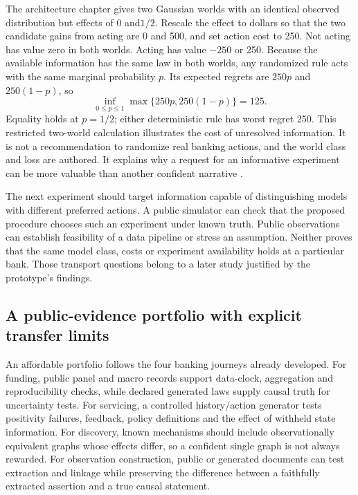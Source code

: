 The architecture chapter gives two Gaussian worlds with an identical observed
distribution but effects of 0 and$1/2$. Rescale the effect to dollars so that
the two candidate gains from acting are 0 and 500, and set action cost to 250.
Not acting has value zero in both worlds. Acting has value $-250$ or 250.
Because the available information has the same law in both worlds, any
randomized rule acts with the same marginal probability $p$. Its expected
regrets are $250p$ and $250(1-p)$, so
\begin{equation}
 \inf_{0\leq p\leq1}\max\{250p,250(1-p)\}=125.
 \label{exec13:frontier-minimax}
\end{equation}
Equality holds at $p=1/2$; either deterministic rule has worst regret 250.
This restricted two-world calculation illustrates the cost of unresolved
information. It is not a recommendation to randomize real banking actions,
and the world class and loss are authored. It explains why a request for an
informative experiment can be more valuable than another confident narrative
\cite{exec13_architecture_exact,exec13_frontier_exact}.

The next experiment should target information capable of distinguishing models
with different preferred actions. A public simulator can check that the
proposed procedure chooses such an experiment under known truth. Public
observations can establish feasibility of a data pipeline or stress an
assumption. Neither proves that the same model class, costs or experiment
availability holds at a particular bank. Those transport questions belong to
a later study justified by the prototype's findings.

\subsection{A public-evidence portfolio with explicit transfer limits}

An affordable portfolio follows the four banking journeys already developed.
For funding, public panel and macro records support data-clock, aggregation
and reproducibility checks, while declared generated laws supply causal truth
for uncertainty tests. For servicing, a controlled history/action generator
tests positivity failures, feedback, policy definitions and the effect of
withheld state information. For discovery, known mechanisms should include
observationally equivalent graphs whose effects differ, so a confident single
graph is not always rewarded. For observation construction, public or generated
documents can test extraction and linkage while preserving the difference
between a faithfully extracted assertion and a true causal statement.


